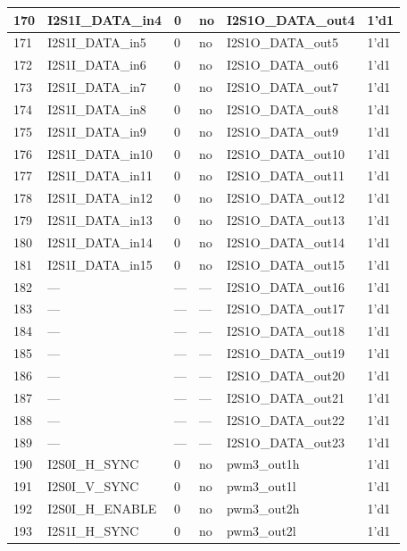 \begin{longtable}[c]{|p{1cm}|p{3.8cm}|p{2.0cm}|p{2.9cm}|p{4.8cm}|p{3.0cm}| }
    170 & I2S1I\_DATA\_in4 & 0 & no & I2S1O\_DATA\_out4 & 1'd1 \\ \hline
    171 & I2S1I\_DATA\_in5 & 0 & no & I2S1O\_DATA\_out5 & 1'd1 \\ \hline
    172 & I2S1I\_DATA\_in6 & 0 & no & I2S1O\_DATA\_out6 & 1'd1 \\ \hline
    173 & I2S1I\_DATA\_in7 & 0 & no & I2S1O\_DATA\_out7 & 1'd1 \\ \hline
    174 & I2S1I\_DATA\_in8 & 0 & no & I2S1O\_DATA\_out8 & 1'd1 \\ \hline
    175 & I2S1I\_DATA\_in9 & 0 & no & I2S1O\_DATA\_out9 & 1'd1 \\ \hline
    176 & I2S1I\_DATA\_in10 & 0 & no & I2S1O\_DATA\_out10 & 1'd1 \\ \hline
    177 & I2S1I\_DATA\_in11 & 0 & no & I2S1O\_DATA\_out11 & 1'd1 \\ \hline
    178 & I2S1I\_DATA\_in12 & 0 & no & I2S1O\_DATA\_out12 & 1'd1 \\ \hline
    179 & I2S1I\_DATA\_in13 & 0 & no & I2S1O\_DATA\_out13 & 1'd1 \\ \hline
    180 & I2S1I\_DATA\_in14 & 0 & no & I2S1O\_DATA\_out14 & 1'd1 \\ \hline
    181 & I2S1I\_DATA\_in15 & 0 & no & I2S1O\_DATA\_out15 & 1'd1 \\ \hline
    182 & --- & --- & --- & I2S1O\_DATA\_out16 & 1'd1 \\ \hline
    183 & --- & --- & --- & I2S1O\_DATA\_out17 & 1'd1 \\ \hline
    184 & --- & --- & --- & I2S1O\_DATA\_out18 & 1'd1 \\ \hline
    185 & --- & --- & --- & I2S1O\_DATA\_out19 & 1'd1 \\ \hline
    186 & --- & --- & --- & I2S1O\_DATA\_out20 & 1'd1 \\ \hline
    187 & --- & --- & --- & I2S1O\_DATA\_out21 & 1'd1 \\ \hline
    188 & --- & --- & --- & I2S1O\_DATA\_out22 & 1'd1 \\ \hline
    189 & --- & --- & --- & I2S1O\_DATA\_out23 & 1'd1 \\ \hline
    190 & I2S0I\_H\_SYNC & 0 & no & pwm3\_out1h & 1'd1 \\ \hline
    191 & I2S0I\_V\_SYNC & 0 & no & pwm3\_out1l & 1'd1 \\ \hline
    192 & I2S0I\_H\_ENABLE & 0 & no & pwm3\_out2h & 1'd1 \\ \hline
    193 & I2S1I\_H\_SYNC & 0 & no & pwm3\_out2l & 1'd1 \\ \hline

\end{longtable}
